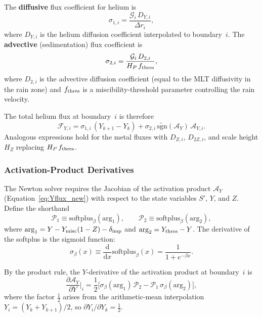 \documentclass{aastex631}
\newcommand{\dd}{\mathrm{d}}
\newcommand{\pp}{\partial}
\newcommand{\Hp}{H_P}
\newcommand{\Yeq}{Y_{\rm misc}}
\newcommand{\softplus}{\mathrm{softplus}}
\begin{document}
The \textbf{diffusive} flux coefficient for helium is
\begin{equation}\label{eq:sigma1}
  \sigma_{1,i} = \frac{\mathcal{G}_i\,D_{Y,i}}{\Delta r_i},
\end{equation}
where $D_{Y,i}$ is the helium diffusion coefficient interpolated to
boundary~$i$.  The \textbf{advective} (sedimentation) flux coefficient is
\begin{equation}\label{eq:sigma2}
  \sigma_{2,i}
  = \frac{\mathcal{G}_i\,D_{2,i}}{\Hp\,f_{\rm thres}},
\end{equation}
where $D_{2,i}$ is the advective diffusion coefficient (equal to the
MLT diffusivity in the rain zone) and $f_{\rm thres}$ is a
miscibility-threshold parameter controlling the rain velocity.

The total helium flux at boundary~$i$ is therefore
\begin{equation}\label{eq:Yflux_total}
  \mathcal{F}_{Y,i}
  = \sigma_{1,i}\,(Y_{k+1}-Y_k)
  + \sigma_{2,i}\,\widetilde{\mathrm{sgn}}(\mathcal{A}_Y)\,\mathcal{A}_{Y,i}.
\end{equation}
Analogous expressions hold for the metal fluxes with
$D_{Z,i}$, $D_{2Z,i}$, and scale height $H_Z$ replacing $\Hp\,f_{\rm thres}$.

\subsubsection{Activation-Product Derivatives}\label{sec:activ_deriv}

The Newton solver requires the Jacobian of the activation product
$\mathcal{A}_Y$ (Equation~\ref{eq:Yflux_new}) with respect to the state
variables $S'$, $Y$, and $Z$.  Define the shorthand
\begin{equation}
  \mathcal{P}_1 \equiv \softplus_\beta(\mathrm{arg}_1),
  \qquad
  \mathcal{P}_2 \equiv \softplus_\beta(\mathrm{arg}_2),
\end{equation}
where $\mathrm{arg}_1 = Y - \Yeq(1-Z) - \delta_{\rm imp}$ and
$\mathrm{arg}_2 = Y_{\rm thres} - Y$.  The derivative of the softplus
is the sigmoid function:
\begin{equation}
  \sigma_\beta(x)
  \equiv \frac{\dd}{\dd x}\softplus_\beta(x)
  = \frac{1}{1 + e^{-\beta x}}.
\end{equation}

By the product rule, the $Y$-derivative of the activation product at
boundary~$i$ is
\begin{equation}\label{eq:dAY_dY}
  \frac{\pp\mathcal{A}_Y}{\pp Y}\bigg|_i
  = \frac{1}{2}\bigl[
      \sigma_\beta(\mathrm{arg}_1)\,\mathcal{P}_2
    - \mathcal{P}_1\,\sigma_\beta(\mathrm{arg}_2)
  \bigr],
\end{equation}
where the factor $\tfrac{1}{2}$ arises from the arithmetic-mean
interpolation $Y_i = (Y_k + Y_{k+1})/2$, so
$\pp Y_i/\pp Y_k = \tfrac{1}{2}$.
\end{document}

